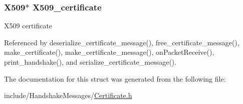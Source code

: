 \subsubsection[{\texorpdfstring{X509\+\_\+certificate}{X509_certificate}}]{\setlength{\rightskip}{0pt plus 5cm}X509$\ast$ X509\+\_\+certificate}\hypertarget{structcertificate__message__t_aa02d32568d177ce73429e6cff12fa7b2}{}\label{structcertificate__message__t_aa02d32568d177ce73429e6cff12fa7b2}
X509 certificate 

Referenced by deserialize\+\_\+certificate\+\_\+message(), free\+\_\+certificate\+\_\+message(), make\+\_\+certificate(), make\+\_\+certificate\+\_\+message(), on\+Packet\+Receive(), print\+\_\+handshake(), and serialize\+\_\+certificate\+\_\+message().



The documentation for this struct was generated from the following file\+:\begin{DoxyCompactItemize}
\item 
include/\+Handshake\+Messages/\hyperlink{_certificate_8h}{Certificate.\+h}\end{DoxyCompactItemize}
